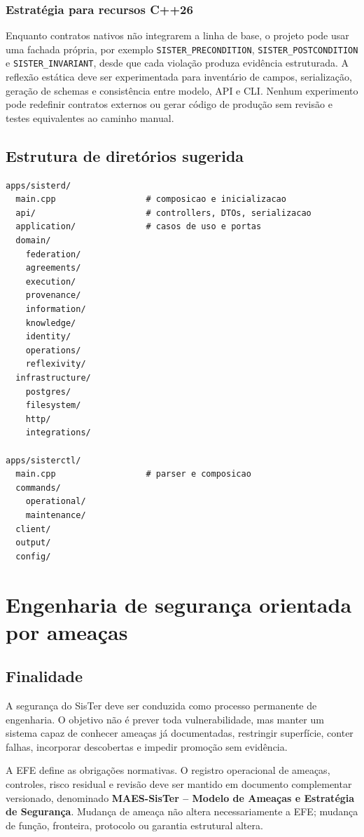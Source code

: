 \documentclass[11pt,a4paper,oneside]{article}
\begin{document}
\subsubsection{Estratégia para recursos C++26}
Enquanto contratos nativos não integrarem a linha de base, o projeto pode usar uma fachada própria, por exemplo \texttt{SISTER\_PRECONDITION}, \texttt{SISTER\_POSTCONDITION} e \texttt{SISTER\_INVARIANT}, desde que cada violação produza evidência estruturada. A reflexão estática deve ser experimentada para inventário de campos, serialização, geração de schemas e consistência entre modelo, API e CLI. Nenhum experimento pode redefinir contratos externos ou gerar código de produção sem revisão e testes equivalentes ao caminho manual.

\subsection{Estrutura de diretórios sugerida}
\begin{lstlisting}
apps/sisterd/
  main.cpp                  # composicao e inicializacao
  api/                      # controllers, DTOs, serializacao
  application/              # casos de uso e portas
  domain/
    federation/
    agreements/
    execution/
    provenance/
    information/
    knowledge/
    identity/
    operations/
    reflexivity/
  infrastructure/
    postgres/
    filesystem/
    http/
    integrations/

apps/sisterctl/
  main.cpp                  # parser e composicao
  commands/
    operational/
    maintenance/
  client/
  output/
  config/
\end{lstlisting}


\section{Engenharia de segurança orientada por ameaças}
\label{sec:engenharia-seguranca}

\subsection{Finalidade}
A segurança do SisTer deve ser conduzida como processo permanente de engenharia. O objetivo não é prever toda vulnerabilidade, mas manter um sistema capaz de conhecer ameaças já documentadas, restringir superfície, conter falhas, incorporar descobertas e impedir promoção sem evidência.

A EFE define as obrigações normativas. O registro operacional de ameaças, controles, risco residual e revisão deve ser mantido em documento complementar versionado, denominado \textbf{MAES-SisTer -- Modelo de Ameaças e Estratégia de Segurança}. Mudança de ameaça não altera necessariamente a EFE; mudança de função, fronteira, protocolo ou garantia estrutural altera.
\end{document}
